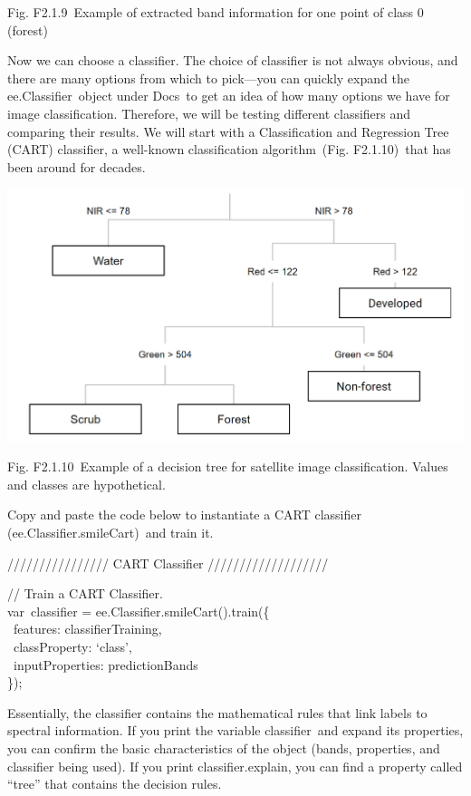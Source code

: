 \documentclass[
  letterpaper,
  DIV=11,
  numbers=noendperiod]{scrreprt}
\begin{document}
Fig. F2.1.9~Example of extracted band information for one point of class
0 (forest)

Now we can choose a classifier. The choice of classifier is not always
obvious, and there are many options from which to pick---you can quickly
expand the ee.Classifier~object under Docs~to get an idea of how many
options we have for image classification. Therefore, we will be testing
different classifiers and comparing their results. We will start with a
Classification and Regression Tree (CART) classifier, a well-known
classification algorithm~(Fig. F2.1.10)~that has been around for
decades.

\includegraphics{./F2/image25.png}

Fig. F2.1.10~Example of a decision tree for satellite image
classification. Values and classes are hypothetical.

Copy and paste the code below to instantiate a CART classifier
(ee.Classifier.smileCart)~and train it.

//////////////// CART Classifier ///////////////////

// Train a CART Classifier.\\
var~classifier = ee.Classifier.smileCart().train(\{\\
\hspace*{0.333em} ~features: classifierTraining,\\
\hspace*{0.333em} ~classProperty: `class',\\
\hspace*{0.333em} ~inputProperties: predictionBands\\
\});

Essentially, the classifier contains the mathematical rules that link
labels to spectral information. If you print the variable classifier~and
expand its properties, you can confirm the basic characteristics of the
object (bands, properties, and classifier being used). If you print
classifier.explain, you can find a property called ``tree'' that
contains the decision rules.
\end{document}
